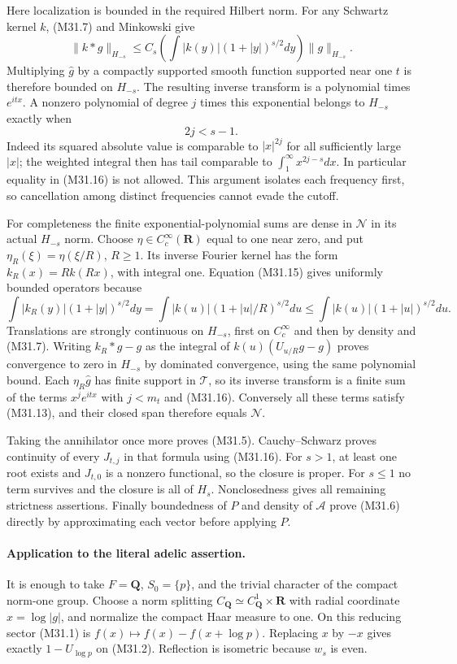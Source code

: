 Here localization is bounded in the required Hilbert norm.
For any Schwartz kernel $k$, (M31.7) and Minkowski give
\[
 \|k*g\|_{H_{-s}}
 \leq C_s\left(\int |k(y)|(1+|y|)^{s/2}dy\right)
                 \|g\|_{H_{-s}}.
 \tag{M31.15}
\]
Multiplying $\widehat g$ by a compactly supported smooth
function supported near one $t$ is therefore bounded on
$H_{-s}$.  The resulting inverse transform is a polynomial
times $e^{itx}$.  A nonzero polynomial of degree $j$
times this exponential belongs to $H_{-s}$ exactly when
\[
                              2j<s-1.
 \tag{M31.16}
\]
Indeed its squared absolute value is comparable to $|x|^{2j}$
for all sufficiently large $|x|$; the weighted integral
then has tail comparable to $\int_1^\infty x^{2j-s}dx$.
In particular equality in (M31.16) is not allowed.
This argument isolates each frequency first, so cancellation
among distinct frequencies cannot evade the cutoff.

For completeness the finite exponential-polynomial sums are
dense in $\mathcal N$ in its actual $H_{-s}$ norm.
Choose $\eta\in C_c^\infty(\mathbf R)$ equal to one near zero,
and put $\eta_R(\xi)=\eta(\xi/R)$, $R\geq1$.
Its inverse Fourier kernel has the form $k_R(x)=Rk(Rx)$,
with integral one.  Equation (M31.15) gives uniformly bounded
operators because
\[
 \int |k_R(y)|(1+|y|)^{s/2}dy
   =\int |k(u)|(1+|u|/R)^{s/2}du
   \leq\int |k(u)|(1+|u|)^{s/2}du.
\]
Translations are strongly continuous on $H_{-s}$, first on
$C_c^\infty$ and then by density and (M31.7).
Writing $k_R*g-g$ as the integral of
$k(u)(U_{u/R}g-g)$ proves convergence to zero in $H_{-s}$
by dominated convergence, using the same polynomial bound.
Each $\eta_R\widehat g$ has finite support in $\mathcal T$,
so its inverse transform is a finite sum of the terms
$x^je^{itx}$ with $j<m_t$ and (M31.16).
Conversely all these terms satisfy (M31.13), and their
closed span therefore equals $\mathcal N$.

Taking the annihilator once more proves (M31.5).
Cauchy--Schwarz proves continuity of every $J_{t,j}$ in that
formula using (M31.16).  For $s>1$, at least one root exists
and $J_{t,0}$ is a nonzero functional, so the closure is proper.
For $s\leq1$ no term survives and the closure is all of $H_s$.
Nonclosedness gives all remaining strictness assertions.
Finally boundedness of $P$ and density of $\mathcal A$ prove
(M31.6) directly by approximating each vector before applying $P$.

\paragraph{Application to the literal adelic assertion.}
It is enough to take $F=\mathbf Q$, $S_0=\{p\}$, and
the trivial character of the compact norm-one group.
Choose a norm splitting $C_{\mathbf Q}\simeq
C_{\mathbf Q}^1\times\mathbf R$ with radial coordinate
$x=\log|g|$, and normalize the compact Haar measure to one.
On this reducing sector (M31.1) is
$f(x)\mapsto f(x)-f(x+\log p)$.
Replacing $x$ by $-x$ gives exactly $1-U_{\log p}$ on
(M31.2).  Reflection is isometric because $w_s$ is even.

